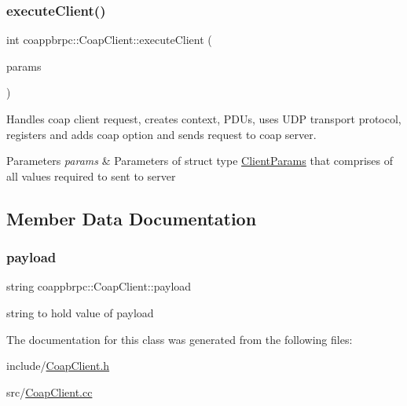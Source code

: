 \subsubsection{\texorpdfstring{execute\+Client()}{executeClient()}}
{\footnotesize\ttfamily int coappbrpc\+::\+Coap\+Client\+::execute\+Client (\begin{DoxyParamCaption}\item[{\hyperlink{structClientParams}{Client\+Params}}]{params }\end{DoxyParamCaption})\hspace{0.3cm}{\ttfamily [static]}}



Handles coap client request, creates context, P\+D\+Us, uses U\+DP transport protocol, registers and adds coap option and sends request to coap server. 


\begin{DoxyParams}{Parameters}
{\em params} & Parameters of struct type \hyperlink{structClientParams}{Client\+Params} that comprises of all values required to sent to server \\
\hline
\end{DoxyParams}


\subsection{Member Data Documentation}
\mbox{\label{classcoappbrpc_1_1CoapClient_ae6909f236ca1cd6b8b6343b7827ea004}} 
\subsubsection{\texorpdfstring{payload}{payload}}
{\footnotesize\ttfamily string coappbrpc\+::\+Coap\+Client\+::payload}

string to hold value of payload 

The documentation for this class was generated from the following files\+:\begin{DoxyCompactItemize}
\item 
include/\hyperlink{CoapClient_8h}{Coap\+Client.\+h}\item 
src/\hyperlink{CoapClient_8cc}{Coap\+Client.\+cc}\end{DoxyCompactItemize}
